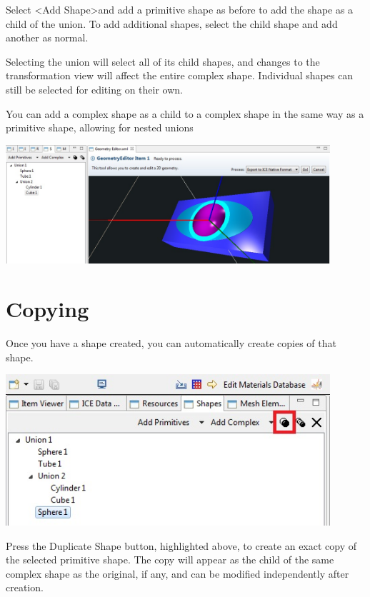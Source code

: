 \documentclass{article}
\begin{document}
Select \textless Add Shape\textgreater and add a primitive shape as before to
add the shape as a child of the union. To add additional shapes, select the
child shape and add another as normal.

Selecting the union will select all of its child shapes, and changes to the
transformation view will affect the entire complex shape. Individual shapes can
still be selected for editing on their own.

You can add a complex shape as a child to a complex shape in the same way as a
primitive shape, allowing for nested unions

\begin{center}
\includegraphics[width=12cm]{images/GeometryStackedUnions.jpg}
\end{center}

\section{Copying}

Once you have a shape created, you can automatically create copies of that
shape. 

\begin{center}
\includegraphics[width=12cm]{images/GeometryDuplicateShape.jpg}
\end{center}

Press the Duplicate Shape button, highlighted above, to create an exact copy of
the selected primitive shape. The copy will appear as the child of the same
complex shape as the original, if any, and can be modified independently after
creation.
\end{document}
